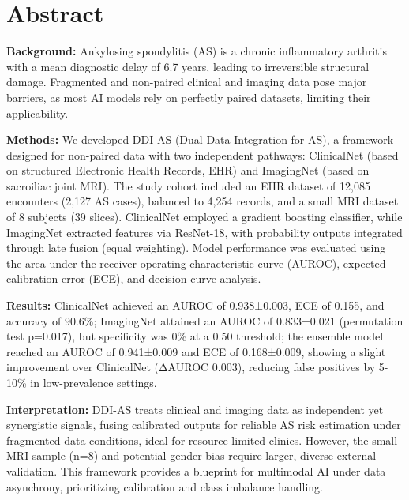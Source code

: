 \documentclass[12pt, a4paper]{article}
\begin{document}
\newpage

\section*{Abstract}

\textbf{Background:} Ankylosing spondylitis (AS) is a chronic inflammatory arthritis with a mean diagnostic delay of 6.7 years, leading to irreversible structural damage. Fragmented and non-paired clinical and imaging data pose major barriers, as most AI models rely on perfectly paired datasets, limiting their applicability.

\textbf{Methods:}  We developed DDI-AS (Dual Data Integration for AS), a framework designed for non-paired data with two independent pathways: ClinicalNet (based on structured Electronic Health Records, EHR) and ImagingNet (based on sacroiliac joint MRI). The study cohort included an EHR dataset of 12,085 encounters (2,127 AS cases), balanced to 4,254 records, and a small MRI dataset of 8 subjects (39 slices). ClinicalNet employed a gradient boosting classifier, while ImagingNet extracted features via ResNet-18, with probability outputs integrated through late fusion (equal weighting). Model performance was evaluated using the area under the receiver operating characteristic curve (AUROC), expected calibration error (ECE), and decision curve analysis.

\textbf{Results:}  ClinicalNet achieved an AUROC of 0.938±0.003, ECE of 0.155, and accuracy of 90.6\%; ImagingNet attained an AUROC of 0.833±0.021 (permutation test p=0.017), but specificity was 0\% at a 0.50 threshold; the ensemble model reached an AUROC of 0.941±0.009 and ECE of 0.168±0.009, showing a slight improvement over ClinicalNet (ΔAUROC 0.003), reducing false positives by 5-10\% in low-prevalence settings.

\textbf{Interpretation:} DDI-AS treats clinical and imaging data as independent yet synergistic signals, fusing calibrated outputs for reliable AS risk estimation under fragmented data conditions, ideal for resource-limited clinics. However, the small MRI sample (n=8) and potential gender bias require larger, diverse external validation. This framework provides a blueprint for multimodal AI under data asynchrony, prioritizing calibration and class imbalance handling.
\newpage

\tableofcontents

\listoffigures
\end{document}
